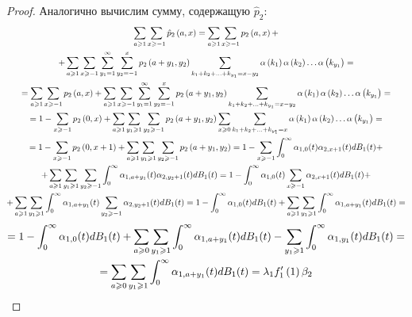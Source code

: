 \documentclass[a4paper,14pt,russian]{article}
\newcommand{\p}{\hat{p}}
\begin{document}
\begin{proof}
Аналогично вычислим сумму, содержащую $\p_2$:
\begin{multline*}
 \sum_{a\geqslant 1}\sum_{x\geqslant -1}\p_2\br{a,x} = \sum_{a\geqslant 1}\sum_{x\geqslant -1} p_2\br{a,x}  +\\+ \sum_{a\geqslant 1}\sum_{x\geqslant -1} \sum_{y_1 = 1}^{\infty} \sum_{y_2 = -1}^{x} p_2\br{a + y_1, y_2}
\sum_{k_1 + k_2 + \ldots + k_{y_1} = x - y_2} \alpha\br{k_1} \alpha\br{k_2} \ldots \alpha\br{k_{y_1}} = \\=
\sum_{a\geqslant 1}\sum_{x\geqslant -1} p_2\br{a,x}  + \sum_{a\geqslant 1}\sum_{x\geqslant -1} \sum_{y_1 = 1}^{\infty} \sum_{y_2 = -1}^{x} p_2\br{a + y_1, y_2}
\sum_{k_1 + k_2 + \ldots + k_{y_1} = x - y_2} \alpha\br{k_1} \alpha\br{k_2} \ldots \alpha\br{k_{y_1}} = \\=
1 - \sum_{x\geqslant -1} p_2\br{0,x} + \sum_{a\geqslant 1}\sum_{y_1 \geqslant 1} \sum_{y_2 \geqslant -1} p_2\br{a+y_1,y_2}\sum_{x \geqslant 0} \sum_{k_1 + k_2 + \ldots + k_{y_1} = x} \alpha\br{k_1} \alpha\br{k_2} \ldots \alpha\br{k_{y_1}} = \\
= 1 - \sum_{x\geqslant -1} p_2\br{0,x + 1} + \sum_{a\geqslant 1}\sum_{y_1 \geqslant 1} \sum_{y_2 \geqslant -1} p_2\br{a+y_1,y_2} = 1 - \sum_{x\geqslant -1}  \int_{0}^{\infty} \alpha_{1,0} (t) \alpha_{2,x + 1} (t)  dB_1(t)  +\\
+ \sum_{a\geqslant 1}\sum_{y_1 \geqslant 1} \sum_{y_2 \geqslant -1} \int_{0}^{\infty} \alpha_{1,a + y_1} (t) \alpha_{2,y_2 + 1} (t)  dB_1(t) = 1 -  \int_{0}^{\infty} \alpha_{1,0} (t) \sum_{x\geqslant -1}  \alpha_{2,x+1} (t)  dB_1(t)  +\\
+ \sum_{a\geqslant 1}\sum_{y_1 \geqslant 1}  \int_{0}^{\infty} \alpha_{1,a + y_1} (t) \sum_{y_2 \geqslant -1} \alpha_{2,y_2 + 1} (t)  dB_1(t) = 1 -  \int_{0}^{\infty} \alpha_{1,0} (t) dB_1(t) 
+ \sum_{a\geqslant 1}\sum_{y_1 \geqslant 1}  \int_{0}^{\infty} \alpha_{1,a + y_1} (t)  dB_1(t) = 
\end{multline*}
\begin{multline*}
= 1 -  \int_{0}^{\infty} \alpha_{1,0} (t) dB_1(t) + \sum_{a\geqslant 0}\sum_{y_1 \geqslant 1}  \int_{0}^{\infty} \alpha_{1,a + y_1} (t)  dB_1(t)  - \sum_{y_1 \geqslant 1}  \int_{0}^{\infty} \alpha_{1, y_1} (t)  dB_1(t) = \\
= \sum_{a\geqslant 0}\sum_{y_1 \geqslant 1}  \int_{0}^{\infty} \alpha_{1,a + y_1} (t)  dB_1(t) = \lambda_1 f_1'\left(1\right) \beta_2
\end{multline*}


\end{proof}
\end{document}

